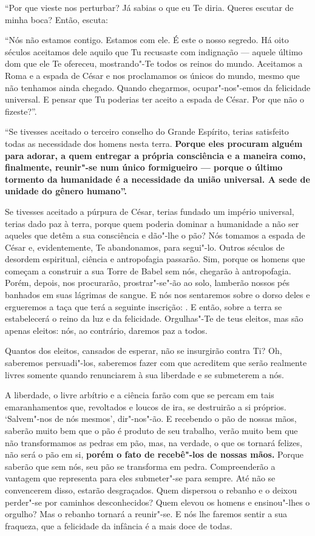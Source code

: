 ``Por que vieste nos perturbar? Já sabias o que eu Te diria. Queres
escutar de minha boca? Então, escuta:

``Nós não estamos contigo. Estamos com ele. É este o nosso segredo. Há
oito séculos aceitamos dele aquilo que Tu recusaste com indignação ---
aquele último dom que ele Te ofereceu, mostrando"-Te todos os reinos do
mundo. Aceitamos a Roma e a espada de César e nos proclamamos os únicos
do mundo, mesmo que não tenhamos ainda chegado. Quando chegarmos,
ocupar"-nos"-emos da felicidade universal. E pensar que Tu poderias ter
aceito a espada de César. Por que não o fizeste?''.

``Se tivesses aceitado o terceiro conselho do Grande Espírito, terias
satisfeito todas as necessidade dos homens nesta terra. \textbf{Porque
eles procuram alguém para adorar, a quem entregar a própria consciência
e a maneira como, finalmente, reunir"-se num único formigueiro --- porque
o último tormento da humanidade é a necessidade da união universal. A
sede de unidade do gênero humano''.}

Se tivesses aceitado a púrpura de César, terias fundado um império
universal, terias dado paz à terra, porque quem poderia dominar a
humanidade a não ser aqueles que detêm a sua consciência e dão"-lhe o
pão? Nós tomamos a espada de César e, evidentemente, Te abandonamos,
para segui"-lo. Outros séculos de desordem espiritual, ciência e
antropofagia passarão. Sim, porque os homens que começam a construir a
sua Torre de Babel sem nós, chegarão à antropofagia. Porém, depois, nos
procurarão, prostrar"-se"-ão ao solo, lamberão nossos pés banhados em suas
lágrimas de sangue. E nós nos sentaremos sobre o dorso deles e
ergueremos a taça que terá a seguinte inscrição: . E então,
sobre a terra se estabelecerá o reino da luz e da felicidade.
Orgulhas"-Te de teus eleitos, mas são apenas eleitos: nós, ao contrário,
daremos paz a todos.

Quantos dos eleitos, cansados de esperar, não se insurgirão contra Ti?
Oh, saberemos persuadi"-los, saberemos fazer com que acreditem que serão
realmente livres somente quando renunciarem à sua liberdade e se
submeterem a nós.

A liberdade, o livre arbítrio e a ciência farão com que se percam em
tais emaranhamentos que, revoltados e loucos de ira, se destruirão a si
próprios. `Salvem"-nos de nós mesmos', dir"-nos"-ão. E recebendo o pão de
nossas mãos, saberão muito bem que o pão é produto de seu trabalho,
verão muito bem que não transformamos as pedras em pão, mas, na verdade,
o que os tornará felizes, não será o pão em si, \textbf{porém o fato de
recebê"-los de nossas mãos.} Porque saberão que sem nós, seu pão se
transforma em pedra. Compreenderão a vantagem que representa para eles
submeter"-se para sempre. Até não se convencerem disso, estarão
desgraçados. Quem dispersou o rebanho e o deixou perder"-se por caminhos
desconhecidos? Quem elevou os homens e ensinou"-lhes o orgulho? Mas o
rebanho tornará a reunir"-se. E nós lhe faremos sentir a sua fraqueza,
que a felicidade da infância é a mais doce de todas.

